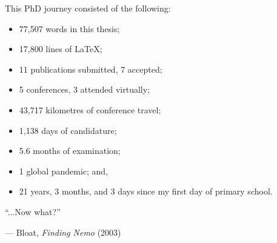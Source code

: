 
\cleardoubleevenemptypage
\thispagestyle{empty}

\vspace*{\fill}

\rmfamily

This PhD journey consisted of the following:

\bigskip

\begin{itemize}
    \item 77,507 words in this thesis;
    \item 17,800 lines of \LaTeX;
    \item 11 publications submitted, 7 accepted;
    \item 5 conferences, 3 attended virtually;
    \item 43,717 kilometres of conference travel;
    \item 1,138 days of candidature; %
    \item 5.6 months of examination; %
    \item 1 global pandemic; and,
    \item 21 years, 3 months, and 3 days since my first day of primary school.
\end{itemize}

\bigskip


\epigraph{``...Now what?''}{--- Bloat, \textit{Finding Nemo} (2003)}
\vspace*{\fill}